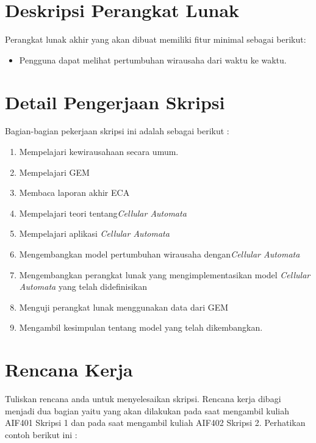 \documentclass[a4paper,twoside]{article}
\begin{document}
\section{Deskripsi Perangkat Lunak}
Perangkat lunak akhir yang akan dibuat memiliki fitur minimal sebagai berikut:
\begin{itemize}
	\item Pengguna dapat melihat pertumbuhan wirausaha dari waktu ke waktu.
		
\end{itemize}

\section{Detail Pengerjaan Skripsi}
Bagian-bagian pekerjaan skripsi ini adalah sebagai berikut :
	\begin{enumerate}
		\item Mempelajari kewirausahaan secara umum.
		\item Mempelajari GEM
		\item Membaca laporan akhir ECA
		\item Mempelajari teori tentang\textit{Cellular Automata}
		\item Mempelajari aplikasi \textit{Cellular Automata}
		\item Mengembangkan model pertumbuhan wirausaha dengan\textit{Cellular Automata}
		\item Mengembangkan perangkat lunak yang mengimplementasikan model \textit{Cellular Automata} yang telah didefinisikan
		\item Menguji perangkat lunak menggunakan data dari GEM
		\item Mengambil kesimpulan tentang model yang telah dikembangkan.
	\end{enumerate}

\section{Rencana Kerja}
Tuliskan rencana anda untuk menyelesaikan skripsi. Rencana kerja dibagi menjadi dua bagian yaitu yang akan dilakukan pada saat mengambil kuliah AIF401 Skripsi 1 dan pada saat mengambil kuliah AIF402 Skripsi 2. Perhatikan contoh berikut ini :
\end{document}
